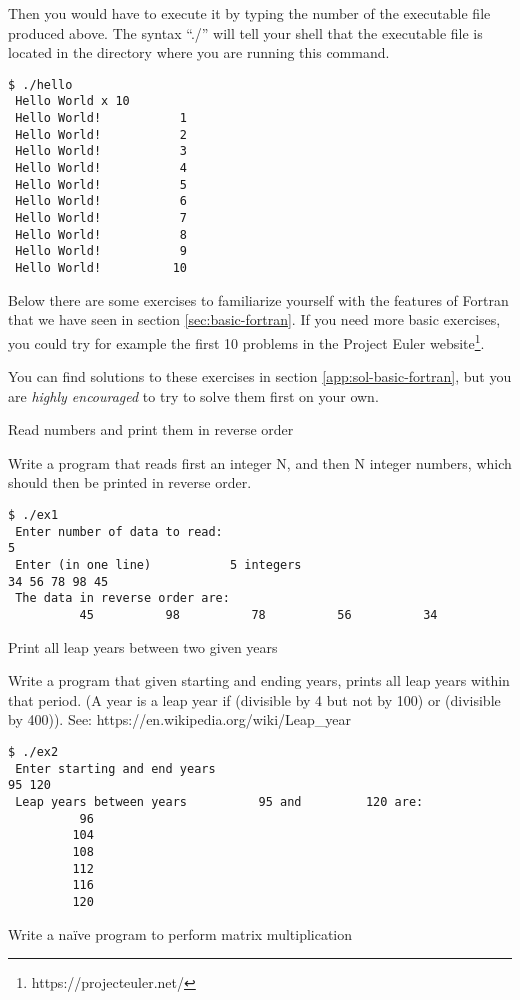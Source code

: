Then you would have to execute it by typing the number of the executable file
produced above. The syntax ``./'' will tell your shell that the executable file
is located in the directory where you are running this command.

\begin{verbatim}
$ ./hello
 Hello World x 10
 Hello World!           1
 Hello World!           2
 Hello World!           3
 Hello World!           4
 Hello World!           5
 Hello World!           6
 Hello World!           7
 Hello World!           8
 Hello World!           9
 Hello World!          10
\end{verbatim}

Below there are some exercises to familiarize yourself with the features of
Fortran that we have seen in section \ref{sec:basic-fortran}. If you need more
basic exercises, you could try for example the first 10 problems in the Project
Euler website\footnote{https://projecteuler.net/}.

You can find solutions to these exercises in section
\ref{app:sol-basic-fortran}, but you are \emph{highly encouraged} to try to solve
them first on your own.

 {Read numbers and print them in reverse order}

Write a program that reads first an integer N, and then N integer numbers, which
should then be printed in reverse order.

\begin{verbatim}
$ ./ex1
 Enter number of data to read:
5
 Enter (in one line)           5 integers
34 56 78 98 45
 The data in reverse order are:
          45          98          78          56          34
\end{verbatim}

 {Print all leap years between two given years}

Write a program that given starting and ending years, prints all leap years
within that period. (A year is a leap year if (divisible by 4 but not by 100) or
(divisible by 400)). See: https://en.wikipedia.org/wiki/Leap\_year

\begin{verbatim}
$ ./ex2
 Enter starting and end years
95 120
 Leap years between years          95 and         120 are:
          96
         104
         108
         112
         116
         120
\end{verbatim}

 {Write a naïve program to perform matrix multiplication}

